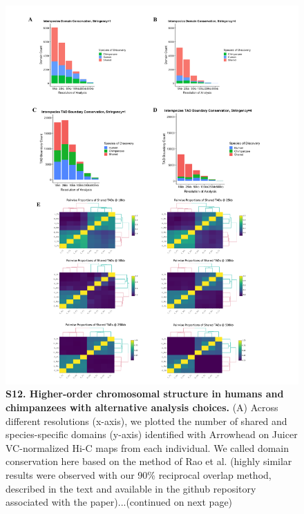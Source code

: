 \begin{figure}[!htb]
\centering
\includegraphics[width=5in]{img/figS12.1.pdf}
\caption[Higher-order chromosomal structure in humans and chimpanzees with alternative analysis choices.]{\textbf{S12. Higher-order chromosomal structure in humans and chimpanzees with alternative analysis choices.} (A) Across different resolutions (x-axis), we plotted the number of shared and species-specific domains (y-axis) identified with Arrowhead \cite{Durand.2016} on Juicer VC-normalized Hi-C maps from each individual. We called domain conservation here based on the method of Rao et al. \cite{Rao.2014} (highly similar results were observed with our 90\% reciprocal overlap method, described in the text and available in the github repository associated with the paper)...(continued on next page)}
\label{fig:ch02-figS12}
\end{figure}

